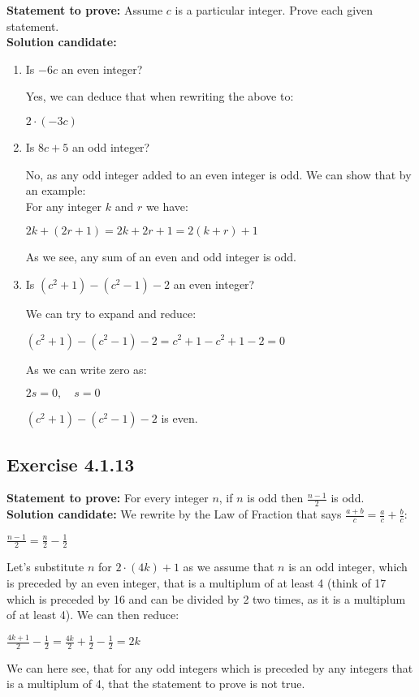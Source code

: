 \documentclass{report}
\newcommand{\cent}[1]{\begin{center}#1\end{center}}
\newcommand{\Prove}{\textbf{Statement to prove: }}
\newcommand{\Solution}{\textbf{Solution candidate: }}
\newcommand{\QED}{\boxed{}}
\newcommand{\Exercise}[1]{\subsection{Exercise #1}}
\newcommand{\defaultEnumerateLabel}{\textbf{\alph*.}}
\begin{document}
	\Prove
	Assume $c$ is a particular integer. Prove each given statement.\\
	
	\Solution
	\begin{enumerate}[label=\defaultEnumerateLabel]
		\item Is $-6c$ an even integer?
		
		Yes, we can deduce that when rewriting the above to:
		
		$2\cdot (-3c) $
		
		\item Is $8c+5$ an odd integer?
		
		No, as any odd integer added to an even integer is odd. We can show that by an example:\\
		
		For any integer $k$ and $r$ we have:
		\cent{$2k + (2r+1) = 2k + 2r + 1 = 2(k+r) + 1$}
		
		As we see, any sum of an even and odd integer is odd.
		
		\item Is $(c^2 + 1) - (c^2 - 1) - 2$ an even integer?
		
		We can try to expand and reduce:
		
		\cent{$(c^2 + 1) - (c^2 - 1) - 2 = c^2 + 1 - c^2 + 1 - 2 = 0$}
		
		As we can write zero as:
		
		\cent{$2s = 0, \quad s = 0$}
		
		$(c^2 + 1) - (c^2 - 1) - 2$ is even.
	\end{enumerate}
	
	\Exercise{4.1.13}
	\Prove
	For every integer $n$, if $n$ is odd then $\frac{n-1}{2}$ is odd.\\
	
	\Solution
	We rewrite by the Law of Fraction that says $\frac{a+b}{c} = \frac{a}{c} + \frac{b}{c}$:
	
	\cent{$\frac{n - 1}{2} = \frac{n}{2} - \frac{1}{2}$}
	
	Let's substitute $n$ for $2\cdot (4k) + 1$ as we assume that $n$ is an odd integer, which is preceded by an even integer, that is a multiplum of at least 4 (think of 17 which is preceded by 16 and can be divided by 2 two times, as it is a multiplum of at least 4). We can then reduce:
	
	\cent{$\frac{4k +1}{2} - \frac{1}{2} = \frac{4k}{2} + \frac{1}{2} - \frac{1}{2} = 2k$}
	
	We can here see, that for any odd integers which is preceded by any integers that is a multiplum of 4, that the statement to prove is not true.\\
	\QED
	
\end{document}
